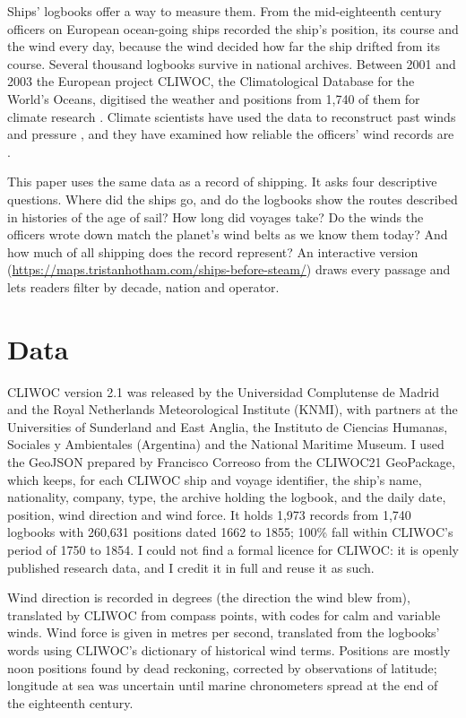 \documentclass[11pt,a4paper]{article}
\begin{document}
Ships' logbooks offer a way to measure them. From the mid-eighteenth century officers on European ocean-going ships recorded the ship's position, its course and the wind every day, because the wind decided how far the ship drifted from its course. Several thousand logbooks survive in national archives. Between 2001 and 2003 the European project CLIWOC, the Climatological Database for the World's Oceans, digitised the weather and positions from 1,740 of them for climate research \citep{garciaherrera2005}. Climate scientists have used the data to reconstruct past winds and pressure \citep{kuttel2010}, and they have examined how reliable the officers' wind records are \citep{wheeler2005}.

This paper uses the same data as a record of shipping. It asks four descriptive questions. Where did the ships go, and do the logbooks show the routes described in histories of the age of sail? How long did voyages take? Do the winds the officers wrote down match the planet's wind belts as we know them today? And how much of all shipping does the record represent? An interactive version (\url{https://maps.tristanhotham.com/ships-before-steam/}) draws every passage and lets readers filter by decade, nation and operator.

\section{Data}
CLIWOC version 2.1 was released by the Universidad Complutense de Madrid and the Royal Netherlands Meteorological Institute (KNMI), with partners at the Universities of Sunderland and East Anglia, the Instituto de Ciencias Humanas, Sociales y Ambientales (Argentina) and the National Maritime Museum. I used the GeoJSON prepared by Francisco Correoso \citep{correoso} from the CLIWOC21 GeoPackage, which keeps, for each CLIWOC ship and voyage identifier, the ship's name, nationality, company, type, the archive holding the logbook, and the daily date, position, wind direction and wind force. It holds 1,973 records from 1,740 logbooks with 260,631 positions dated 1662 to 1855; 100\% fall within CLIWOC's period of 1750 to 1854. I could not find a formal licence for CLIWOC: it is openly published research data, and I credit it in full and reuse it as such.

Wind direction is recorded in degrees (the direction the wind blew from), translated by CLIWOC from compass points, with codes for calm and variable winds. Wind force is given in metres per second, translated from the logbooks' words using CLIWOC's dictionary of historical wind terms. Positions are mostly noon positions found by dead reckoning, corrected by observations of latitude; longitude at sea was uncertain until marine chronometers spread at the end of the eighteenth century.
\end{document}
